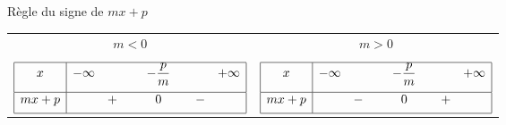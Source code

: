 \begin{Aretenir}
      Règle du signe de $mx+p$ \\
      
      \begin{tabular}{cc}
        $m<0$ & $m>0$ \\
        & \\
        $\begin{array}{|c|ccccc|}
          \hline
          x & -\infty & & -\dfrac{p}{m} & & +\infty \\[2ex]
          \hline
          mx+p & & + \quad \ & 0 & \quad - & \\[1ex]
          \hline
        \end{array}$
        &
        $\begin{array}{|c|ccccc|}
          \hline
          x & -\infty & & -\dfrac{p}{m} & & +\infty \\[2ex]
          \hline
          mx+p & & - \quad \ & 0 & \quad + & \\[1ex]
          \hline
        \end{array}$ \\
      \end{tabular}  \\[1ex] 
\end{Aretenir}

